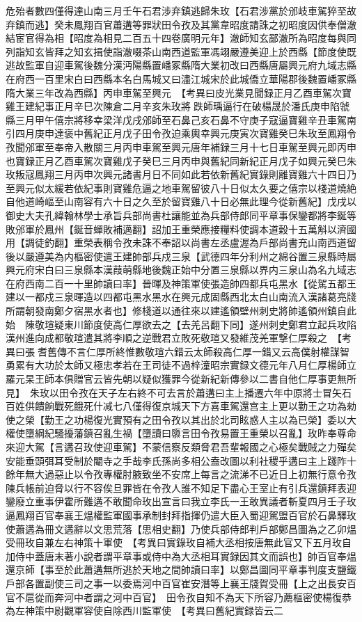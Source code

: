 危殆者數四僅得達山南三月壬午石君涉弃鎮逃歸朱玫【石君涉黨於邠岐車駕猝至故弃鎮而逃】癸未鳳翔百官蕭遘等罪狀田令孜及其黨韋昭度請誅之初昭度因供奉僧澈結宦官得為相【昭度為相見二百五十四卷廣明元年】澈師知玄鄙澈所為昭度每與同列詣知玄皆拜之知玄揖使詣澈啜茶山南西道監軍馮翊嚴遵美迎上於西縣【節度使既逃故監軍自迎車駕後魏分漢沔陽縣置嶓冢縣隋大業初改曰西縣唐屬興元府九域志縣在府西一百里宋白曰西縣本名白馬城又曰濜江城宋於此城僑立華陽郡後魏置嶓冢縣隋大業三年改為西縣】丙申車駕至興元　【考異曰皮光業見聞録正月乙酉車駕次寶雞王建紀事正月辛巳次陳倉二月辛亥朱玫將跌師瑀逼行在破楊晟於潘氏庚申陷虢縣三月甲午僖宗將移幸梁洋戊戌邠師至石鼻己亥石鼻不守庚子寇逼寶雞辛丑車駕南引四月庚申達褒中舊紀正月戊子田令孜迫乘輿幸興元庚寅次寶雞癸巳朱玫至鳳翔令孜聞邠軍至奉帝入散關三月丙申車駕至興元唐年補録三月十七日車駕至興元即丙申也寶録正月乙酉車駕次寶雞戊子癸巳三月丙申與舊紀同新紀正月戊子如興元癸巳朱玫叛寇鳳翔三月丙申次興元諸書月日不同如此若依新舊紀實錄則離寶雞六十四日乃至興元似太緩若依紀事則寶雞危逼之地車駕留彼八十日似太久要之僖宗以棧道燒絶自他道崎嶇至山南容有六十日之久至於留寶雞八十日必無此理今從新舊紀】戊戌以御史大夫孔緯翰林學士承旨兵部尚書杜讓能並為兵部侍郎同平章事保鑾都將李鋋等敗邠軍於鳳州【鋋音蟬敗補邁翻】詔加王重榮應接糧料使調本道穀十五萬斛以濟國用【調徒釣翻】重榮表稱令孜未誅不奉詔以尚書左丞盧渥為戶部尚書充山南西道留後以嚴遵美為内樞密使遣王建帥部兵戍三泉【武德四年分利州之綿谷置三泉縣時屬興元府宋白曰三泉縣本漢葭萌縣地後魏正始中分置三泉縣以界内三泉山為名九域志在府西南二百一十里帥讀曰率】晉暉及神策軍使張造帥四都兵屯黑水【從駕五都王建以一都戍三泉暉造以四都屯黑水黑水在興元成固縣西北太白山南流入漢諸葛亮牋所謂朝發南鄭夕宿黑水者也】修棧道以通往來以建遙領壁州刺史將帥遙領州鎮自此始　陳敬瑄疑東川節度使高仁厚欲去之【去羌呂翻下同】遂州刺史鄭君立起兵攻陷漢州進向成都敬瑄遣其將李順之逆戰君立敗死敬瑄又發維茂羌軍撃仁厚殺之　【考異曰張耆舊傳不言仁厚所終惟數敬瑄六錯云太師殺高仁厚一錯又云高僕射權謀智勇累有大功於太師又極忠孝若在王司徒不過梓潼昭宗實録文德元年八月仁厚楊師立羅元杲王師本俱贈官云皆先朝以疑似獲罪今從新紀新傳參以二書自他仁厚事更無所見】　朱玫以田令孜在天子左右終不可去言於蕭遘曰主上播遷六年中原將士冒矢石百姓供饋餉戰死餓死什减七八僅得復京城天下方喜車駕還宫主上更以勤王之功為勑使之榮【勤王之功楊復光實預有之田令孜以其出於北司眩惑人主以為已榮】委以大權使墮綱紀騷擾藩鎮召亂生禍【墮讀曰隳言田令孜易置王重榮以召亂】玫昨奉尊命來迎大駕【言遘召玫使迎車駕】不蒙信察反類脅君吾輩報國之心極矣戰賊之力殫矣安能垂頭弭耳受制於閹寺之手哉李氏孫尚多相公盍改圖以利社稷乎遘曰主上踐阼十餘年無大過惡止以令孜專權肘腋致坐不安席上每言之流涕不已近日上初無行意令孜陳兵帳前迫脅以行不容俟旦罪皆在令孜人誰不知足下盡心王室止有引兵還鎮拜表迎鑾廢立重事伊霍所難遘不敢聞命玫出宣言曰我立李氏一王敢異議者斬夏四月壬子玫逼鳳翔百官奉襄王煴權監軍國事承制封拜指揮仍遣大臣入蜀迎駕盟百官於石鼻驛玫使蕭遘為冊文遘辭以文思荒落【思相史翻】乃使兵部侍郎判戶部鄭昌圖為之乙卯煴受冊玫自兼左右神策十軍使　【考異曰實錄玫自補大丞相按唐無此官又下五月玫自加侍中蓋唐末著小說者謂平章事或侍中為大丞相耳實録因其文而誤也】帥百官奉煴還京師【事至於此蕭遘無所逃於天地之間帥讀曰率】以鄭昌圖同平章事判度支鹽鐵戶部各置副使三司之事一以委焉河中百官崔安潛等上襄王牋賀受冊【上之出長安百官不扈從而奔河中者謂之河中百官】　田令孜自知不為天下所容乃薦樞密使楊復恭為左神策中尉觀軍容使自除西川監軍使　【考異曰舊紀實録皆云二